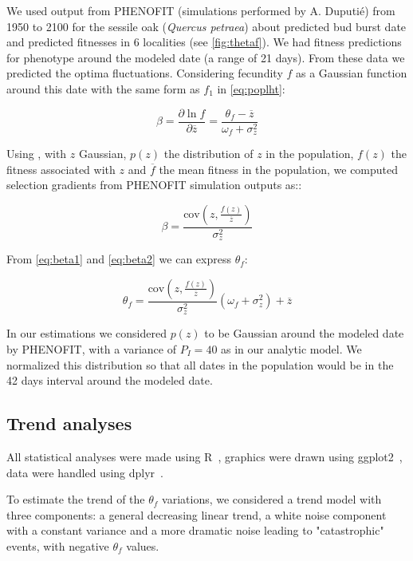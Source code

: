  We used output from \textsc{PHENOFIT} (simulations performed by A. Duputié) from 1950 to 2100 for the sessile oak (\textit{Quercus petraea}) about predicted bud burst date and predicted fitnesses in 6 localities (see \autoref{fig:thetaf}). We had fitness predictions for phenotype around the modeled date (a range of 21 days). From these data we predicted the optima fluctuations. Considering fecundity $f$ as a Gaussian function around this date with the same form as $f_1$ in \autoref{eq:poplht}:

\begin{equation}
	\label{eq:beta1}
	\beta = \frac{\partial \ln f}{\partial \overline{z}} = \frac{\theta_f - \overline{z}}{\omega_f + \sigma_z^2}
\end{equation}

Using \citep{lande_measurement_1983}, with $z$ Gaussian, $p(z)$ the distribution of $z$ in the population, $f(z)$ the fitness associated with $z$ and $\overline{f}$ the mean fitness in the population, we computed selection gradients from PHENOFIT simulation outputs as::

\begin{equation}
	\label{eq:beta2}
	\beta = \frac{\text{cov}(z, \frac{f(z)}{\overline{z}})}{\sigma_z^2}
\end{equation}

From \eqref{eq:beta1} and \eqref{eq:beta2} we can express $\theta_f$:

\begin{equation}
	\theta_f = \frac{\text{cov}(z, \frac{f(z)}{\overline{z}})}{\sigma_z^2} (\omega_f + \sigma_z^2) + \overline{z}
\end{equation}

In our estimations we considered $p(z)$ to be Gaussian around the modeled date by \textsc{PHENOFIT}, with a variance of $P_I=40$ as in our analytic model. We normalized this distribution so that all dates in the population would be in the 42 days interval around the modeled date.

\subsection*{Trend analyses}

All statistical analyses were made using R~\citep{R_2014}, graphics were drawn using ggplot2~\citep{ggplot2_2009}, data were handled using dplyr~\citep{dplyr_2014}.

To estimate the trend of the $\theta_f$ variations, we considered a trend model with three components: a general decreasing linear trend, a white noise component with a constant variance and a more dramatic noise leading to "catastrophic" events, with negative $\theta_f$ values.

